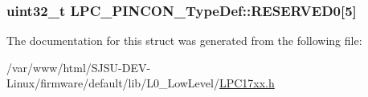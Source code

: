 \subsubsection[{\texorpdfstring{R\+E\+S\+E\+R\+V\+E\+D0}{RESERVED0}}]{\setlength{\rightskip}{0pt plus 5cm}uint32\+\_\+t L\+P\+C\+\_\+\+P\+I\+N\+C\+O\+N\+\_\+\+Type\+Def\+::\+R\+E\+S\+E\+R\+V\+E\+D0\mbox{[}5\mbox{]}}\hypertarget{structLPC__PINCON__TypeDef_aca308efb628054ab6d740646aba7d23c}{}\label{structLPC__PINCON__TypeDef_aca308efb628054ab6d740646aba7d23c}


The documentation for this struct was generated from the following file\+:\begin{DoxyCompactItemize}
\item 
/var/www/html/\+S\+J\+S\+U-\/\+D\+E\+V-\/\+Linux/firmware/default/lib/\+L0\+\_\+\+Low\+Level/\hyperlink{LPC17xx_8h}{L\+P\+C17xx.\+h}\end{DoxyCompactItemize}

